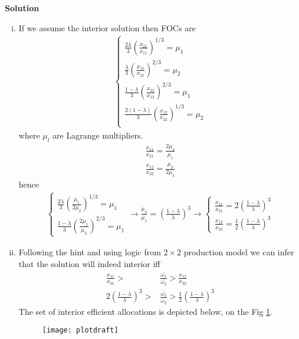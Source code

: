 \documentclass[a4paper]{article}
\begin{document}
\textbf{Solution}

\begin{enumerate}[(i)] 
	\item If we assume the interior solution then FOCs are
	\begin{align*}
	\begin{cases}
	\frac{2 \lambda }{3} \left(\frac{x_{21}}{x_{11}}\right)^{1/3} = \mu_1\\
	\frac{\lambda}{3} \left(\frac{x_{11}}{x_{21}}\right)^{2/3} = \mu_2\\
	\frac{1 - \lambda}{3} \left(\frac{x_{22}}{x_{12}}\right)^{2/3} = \mu_1\\
	\frac{2(1-\lambda)}{3} \left(\frac{x_{12}}{x_{22}}\right)^{1/3} = \mu_2\\
	\end{cases}
	\end{align*}
	where $\mu_l$ are Lagrange multipliers.
	\begin{align*}
	\frac{x_{11}}{x_{21}} = \frac{2\mu_2}{\mu_1}\\
	\frac{x_{12}}{x_{22}} = \frac{\mu_2}{2\mu_1}
	\end{align*}
	hence
	\begin{align*}
	\begin{cases}
	\frac{2\lambda}{3} \left(\frac{\mu_1}{2 \mu_2}\right)^{1/3} = \mu_1\\
	\frac{1-\lambda}{3} \left(\frac{2\mu_1}{\mu_2}\right)^{2/3} = \mu_1
	\end{cases} \to \frac{\mu_2}{\mu_1} = \left(\frac{1-\lambda}{\lambda}\right)^{3} \to \begin{cases}
	\frac{x_{11}}{x_{21}} = 2 \left(\frac{1-\lambda}{\lambda}\right)^{3}\\
	\frac{x_{12}}{x_{22}} = \frac{1}{2}\left(\frac{1-\lambda}{\lambda}\right)^{3}
	\end{cases}
	\end{align*}
	\item Following the hint and using logic from $2 \times 2$ production model we can infer that the solution will indeed interior iff
	\begin{align*}
	\frac{x_{11}}{x_{21}} >& \frac{\bar{\omega_1}}{\bar{\omega_2}} > \frac{x_{12}}{x_{22}}\\
	2\left(\frac{1 - \lambda}{\lambda}\right)^3 >& \frac{\bar{\omega_1}}{\bar{\omega_2}} >\frac{1}{2} \left(\frac{1 - \lambda}{\lambda}\right)^3
	\end{align*}
	The set of interior efficient allocations is depicted below, on the Fig \ref{fig1}.
	\begin{figure}[h]
		\centering
		\texttt{[image: plotdraft]}
		\caption{}\label{fig1}
	\end{figure}
\end{enumerate}
\end{document}
